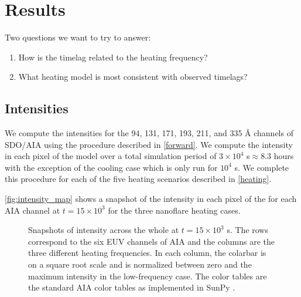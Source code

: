 \section{Results}\label{results}

Two questions we want to try to answer:
\begin{enumerate}
    \item How is the timelag related to the heating frequency?
    \item What heating model is most consistent with observed timelags?
\end{enumerate}

\subsection{Intensities}

We compute the intensities for the 94, 131, 171, 193, 211, and 335 \AA{} channels of SDO/AIA using the procedure described in \autoref{forward}. We compute the intensity in each pixel of the model \AR{} over a total simulation period of $3\times10^4$ s$\approx8.3$ hours with the exception of the cooling case which is only run for $10^4$ s. We complete this procedure for each of the five heating scenarios described in \autoref{heating}. 

\autoref{fig:intensity_map} shows a snapshot of the intensity in each pixel of the \AR{} for each AIA channel at $t=15\times10^3$ for the three nanoflare heating cases.

\begin{figure*}
    \caption{Snapshots of intensity across the whole \AR{} at $t=15\times10^3$ s. The rows correspond to the six EUV channels of AIA and the columns are the three different heating frequencies. In each column, the colarbar is on a square root scale and is normalized between zero and the maximum intensity in the low-frequency case. The color tables are the standard AIA color tables as implemented in SunPy \citep{sunpy_community_sunpypython_2015}.}
    \label{fig:intensity_map}
\end{figure*}

